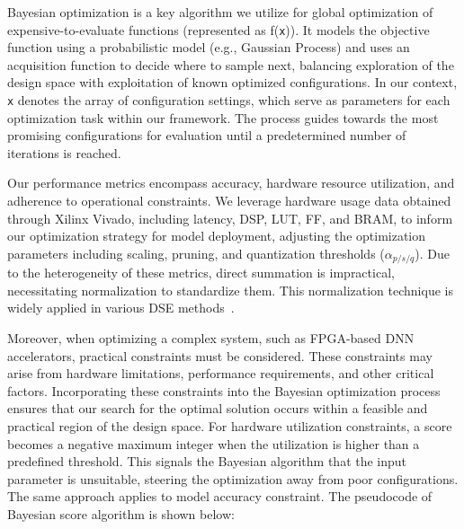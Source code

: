 Bayesian optimization is a key algorithm we utilize for global optimization of expensive-to-evaluate functions (represented as f(\texttt{x})). It models the objective function using a probabilistic model (e.g., Gaussian Process) and uses an acquisition function to decide where to sample next, balancing exploration of the design space with exploitation of known optimized configurations. In our context, \texttt{x} denotes the array of configuration settings, which serve as parameters for each optimization task within our framework. The process guides towards the most promising configurations for evaluation until a predetermined number of iterations is reached.

Our performance metrics encompass accuracy, hardware resource utilization, and adherence to operational constraints. We leverage hardware usage data obtained through Xilinx Vivado, including latency, DSP, LUT, FF, and BRAM, to inform our optimization strategy for model deployment, adjusting the optimization parameters including scaling, pruning, and quantization thresholds ($\alpha_{p/s/q}$). 
Due to the heterogeneity of these metrics, direct summation is impractical, necessitating normalization to standardize them. This normalization technique is widely applied in various DSE methods~\cite{sohrabizadeh2022automated}.



Moreover, when optimizing a complex system, such as FPGA-based DNN accelerators, practical constraints must be considered. These constraints may arise from hardware limitations, performance requirements, and other critical factors. Incorporating these constraints into the Bayesian optimization process ensures that our search for the optimal solution occurs within a feasible and practical region of the design space. For hardware utilization constraints, a score becomes a negative maximum integer when the utilization is higher than a predefined threshold. This signals the Bayesian algorithm that the input parameter is unsuitable, steering the optimization away from poor configurations. The same approach applies to model accuracy constraint. The pseudocode of Bayesian score algorithm is shown below: 
%

